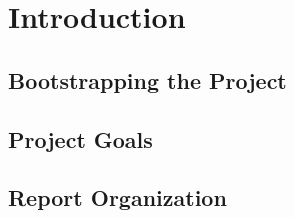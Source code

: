 \chapter{Introduction}
\dummy

\section{Bootstrapping the Project}
\dummy

\section{Project Goals}
\dummy

\section{Report Organization}
\dummy